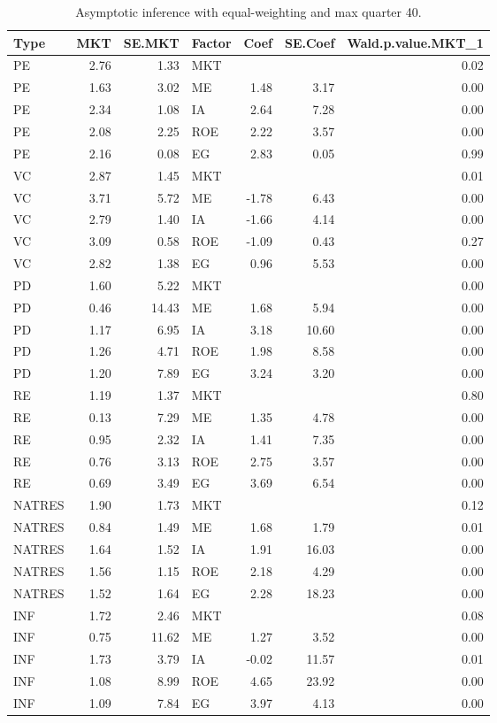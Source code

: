 \documentclass[12pt]{article}
\begin{document}
\begin{table}[ht]
	\centering
	\begin{tabular}{lrrlrrr}
		\hline
		Type & MKT & SE.MKT & Factor & Coef & SE.Coef & Wald.p.value.MKT\_1 \\ 
		\hline
		PE & 2.76 & 1.33 & MKT &  &  & 0.02 \\ 
		PE & 1.63 & 3.02 & ME & 1.48 & 3.17 & 0.00 \\ 
		PE & 2.34 & 1.08 & IA & 2.64 & 7.28 & 0.00 \\ 
		PE & 2.08 & 2.25 & ROE & 2.22 & 3.57 & 0.00 \\ 
		PE & 2.16 & 0.08 & EG & 2.83 & 0.05 & 0.99 \\ 
		VC & 2.87 & 1.45 & MKT &  &  & 0.01 \\ 
		VC & 3.71 & 5.72 & ME & -1.78 & 6.43 & 0.00 \\ 
		VC & 2.79 & 1.40 & IA & -1.66 & 4.14 & 0.00 \\ 
		VC & 3.09 & 0.58 & ROE & -1.09 & 0.43 & 0.27 \\ 
		VC & 2.82 & 1.38 & EG & 0.96 & 5.53 & 0.00 \\ 
		PD & 1.60 & 5.22 & MKT &  &  & 0.00 \\ 
		PD & 0.46 & 14.43 & ME & 1.68 & 5.94 & 0.00 \\ 
		PD & 1.17 & 6.95 & IA & 3.18 & 10.60 & 0.00 \\ 
		PD & 1.26 & 4.71 & ROE & 1.98 & 8.58 & 0.00 \\ 
		PD & 1.20 & 7.89 & EG & 3.24 & 3.20 & 0.00 \\ 
		RE & 1.19 & 1.37 & MKT &  &  & 0.80 \\ 
		RE & 0.13 & 7.29 & ME & 1.35 & 4.78 & 0.00 \\ 
		RE & 0.95 & 2.32 & IA & 1.41 & 7.35 & 0.00 \\ 
		RE & 0.76 & 3.13 & ROE & 2.75 & 3.57 & 0.00 \\ 
		RE & 0.69 & 3.49 & EG & 3.69 & 6.54 & 0.00 \\ 
		NATRES & 1.90 & 1.73 & MKT &  &  & 0.12 \\ 
		NATRES & 0.84 & 1.49 & ME & 1.68 & 1.79 & 0.01 \\ 
		NATRES & 1.64 & 1.52 & IA & 1.91 & 16.03 & 0.00 \\ 
		NATRES & 1.56 & 1.15 & ROE & 2.18 & 4.29 & 0.00 \\ 
		NATRES & 1.52 & 1.64 & EG & 2.28 & 18.23 & 0.00 \\ 
		INF & 1.72 & 2.46 & MKT &  &  & 0.08 \\ 
		INF & 0.75 & 11.62 & ME & 1.27 & 3.52 & 0.00 \\ 
		INF & 1.73 & 3.79 & IA & -0.02 & 11.57 & 0.01 \\ 
		INF & 1.08 & 8.99 & ROE & 4.65 & 23.92 & 0.00 \\ 
		INF & 1.09 & 7.84 & EG & 3.97 & 4.13 & 0.00 \\ 
		\hline
	\end{tabular}
	\caption{Asymptotic inference with equal-weighting and max quarter 40.} 
\end{table}
\end{document}
